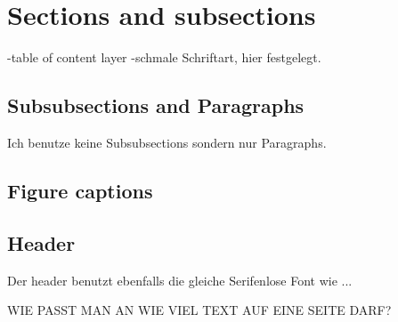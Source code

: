 \section{Sections and subsections}
-table of content layer
-schmale Schriftart, hier festgelegt.

\subsection{Subsubsections and Paragraphs}
Ich benutze keine Subsubsections sondern nur Paragraphs.

\subsection{Figure captions}

\subsection{Header}
Der header benutzt ebenfalls die gleiche Serifenlose Font wie ...

WIE PASST MAN AN WIE VIEL TEXT AUF EINE SEITE DARF?

